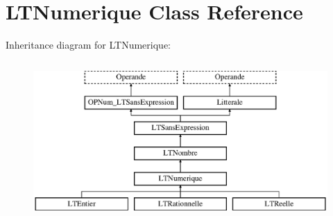 \hypertarget{class_l_t_numerique}{}\section{L\+T\+Numerique Class Reference}
\label{class_l_t_numerique}
Inheritance diagram for L\+T\+Numerique\+:\begin{figure}[H]
\begin{center}
\leavevmode
\includegraphics[height=6.000000cm]{class_l_t_numerique}
\end{center}
\end{figure}
